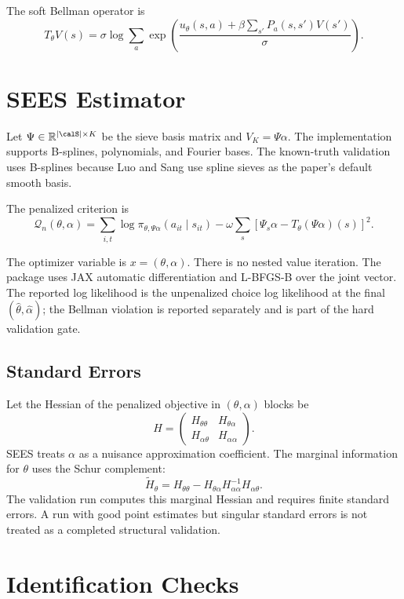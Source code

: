 \documentclass[10pt]{article}
\begin{document}
The soft Bellman operator is
\[
T_\theta V(s)
=
\sigma \log \sum_a
\exp\left(
\frac{u_\theta(s,a)+\beta\sum_{s'}P_a(s,s')V(s')}{\sigma}
\right).
\]

\section{SEES Estimator}

Let \(\Psi\in\mathbb R^{|\calS|\times K}\) be the sieve basis matrix and
\(V_K=\Psi\alpha\). The implementation supports B-splines, polynomials, and
Fourier bases. The known-truth validation uses B-splines because Luo and Sang
use spline sieves as the paper's default smooth basis.

The penalized criterion is
\[
\mathcal Q_n(\theta,\alpha)
=
\sum_{i,t}\log \pi_{\theta,\Psi\alpha}(a_{it}\mid s_{it})
-
\omega
\sum_s
\left[
\Psi_s\alpha - T_\theta(\Psi\alpha)(s)
\right]^2.
\]

The optimizer variable is \(x=(\theta,\alpha)\). There is no nested value
iteration. The package uses JAX automatic differentiation and L-BFGS-B over
the joint vector. The reported log likelihood is the unpenalized choice log
likelihood at the final \((\hat\theta,\hat\alpha)\); the Bellman violation is
reported separately and is part of the hard validation gate.

\subsection{Standard Errors}

Let the Hessian of the penalized objective in \((\theta,\alpha)\) blocks be
\[
H =
\begin{pmatrix}
H_{\theta\theta} & H_{\theta\alpha}\\
H_{\alpha\theta} & H_{\alpha\alpha}
\end{pmatrix}.
\]
SEES treats \(\alpha\) as a nuisance approximation coefficient. The marginal
information for \(\theta\) uses the Schur complement:
\[
\tilde H_\theta
=
H_{\theta\theta}
-
H_{\theta\alpha}
H_{\alpha\alpha}^{-1}
H_{\alpha\theta}.
\]
The validation run computes this marginal Hessian and requires finite
standard errors. A run with good point estimates but singular standard errors
is not treated as a completed structural validation.

\section{Identification Checks}
\end{document}
